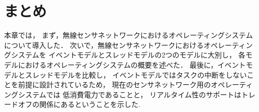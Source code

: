 \section{まとめ}


本章では，
まず，無線センサネットワークにおけるオペレーティングシステムについて導入した．
次いで，無線センサネットワークにおけるオペレーティングシステムを
イベントモデルとスレッドモデルの2つのモデルに大別し，
各モデルにおけるオペレーティングシステムの概要を述べた．
最後に，イベントモデルとスレッドモデルを比較し，
イベントモデルではタスクの中断をしないことを前提に設計されているため，
現在のセンサネットワーク用のオペレーティングシステムでは
低消費電力であることと，
リアルタイム性のサポートはトレードオフの関係にあるということを示した.




